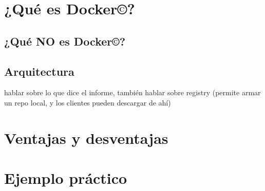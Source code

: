 \documentclass[14pt]{extarticle}
\newcommand{\docker}{Docker\copyright}
\begin{document}
    \clearpage
    \section{¿Qué es \docker{}?}
        
    \subsection{¿Qué \textbf{NO} es \docker{}?}
    \subsection{Arquitectura}


    hablar sobre lo que dice el informe, también hablar sobre registry (permite armar un repo local, y los clientes pueden descargar de ahí)

    \clearpage
    \section{Ventajas y desventajas}


    \clearpage
    \section{Ejemplo práctico}


    \clearpage
    
    
\end{document}
